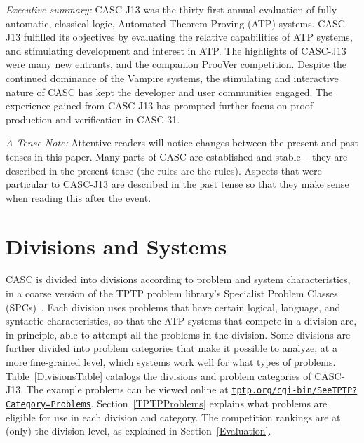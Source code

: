 \documentclass[aic]{iosart2x}
\newcommand{\smalltt}[1]{\small \texttt{#1}}
\newcommand{\THIS}{\mbox{CASC-J13}}
\newcommand{\NEXT}{\mbox{CASC-31}}
\newcommand{\NTHCOMPETITION}{\mbox{thirty-first}}
\begin{document}
\vspace*{0.5em}
\emph{Executive summary:} \THIS{} was the \NTHCOMPETITION{} annual evaluation of fully 
automatic, classical logic, Automated Theorem Proving (ATP) systems.
\THIS{} fulfilled its objectives by evaluating the relative capabilities of ATP systems,
and stimulating development and interest in ATP.
The highlights of \THIS{} were many new entrants, and the companion ProoVer competition.
Despite the continued dominance of the Vampire systems, the stimulating and interactive nature
of CASC has kept the developer and user communities engaged.
The experience gained from \THIS{} has prompted further focus on proof production and verification
in \NEXT{}.

\vspace*{0.5em}
\emph{A Tense Note:}
Attentive readers will notice changes between the present and past tenses in this paper.
Many parts of CASC are established and stable -- they are described in the present tense (the
rules are the rules).
Aspects that were particular to \THIS{} are described in the past tense so that they make sense
when reading this after the event.

\section{Divisions and Systems}
\label{DivisionsSystems}

CASC is divided into divisions according to problem and system characteristics, in a coarse
version of the TPTP problem library's Specialist Problem Classes (SPCs)~\cite{SS01}.
Each division uses problems that have certain logical, language, and syntactic characteristics,
so that the ATP systems that compete in a division are, in principle, able to attempt all the 
problems in the division.
Some divisions are further divided into problem categories that make it possible to analyze, at
a more fine-grained level, which systems work well for what types of problems.
Table~\ref{DivisionsTable} catalogs the divisions and problem categories of \THIS{}.
The example problems can be viewed online at
\href{https://tptp.org/cgi-bin/SeeTPTP?Category=Problems}{\smalltt{tptp.org/cgi-bin/SeeTPTP?Category=Problems}}.
Section~\ref{TPTPProblems}
explains what problems are eligible for use in each division and category.
The competition rankings are at (only) the division level, as explained in 
Section~\ref{Evaluation}.
\end{document}
